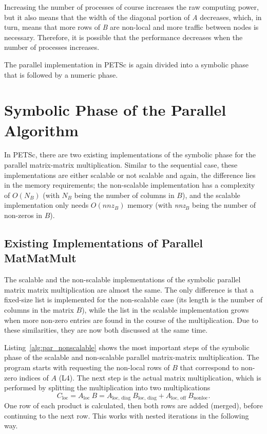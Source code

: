 Increasing the number of processes of course increases the raw computing power, but it also means that the width of the diagonal portion of \textit{A} decreases, which, in turn, means that more rows of \textit{B} are non-local and  more traffic between nodes is necessary. Therefore, it is possible that the performance decreases when the number of processes increases.

The parallel implementation in PETSc is again divided into a symbolic phase that is followed by a numeric phase. 


\section{Symbolic Phase of the Parallel Algorithm}
In PETSc, there are two existing implementations of the symbolic phase for the parallel matrix-matrix multiplication. Similar to the sequential case, these implementations are either scalable or not scalable and again, the difference lies in the memory requirements; the non-scalable implementation has a complexity of $O(N_B)$ (with $N_B$ being the number of columns in $B$), and the scalable implementation only needs $O(\textit{nnz}_B)$ memory (with \textit{nnz}$_B$ being the number of non-zeros in $B$).

\subsection{Existing Implementations of Parallel MatMatMult}
\label{sec:existing_impl}
The scalable and the non-scalable implementations of the symbolic parallel matrix matrix multiplication are almost the same. The only difference is that a fixed-size list is implemented for the non-scalable case (its length is the number of columns in the matrix $B$), while the list in the scalable implementation grows when more non-zero entries are found in the course of the multiplication. Due to these similarities, they are now both discussed at the same time.


Listing~\ref{alg:par_nonscalable} shows the most important steps of the symbolic phase of the scalable and non-scalable parallel matrix-matrix multiplication. The program starts with requesting the non-local rows of $B$ that correspond to non-zero indices of $A$ (L4). The next step is the actual matrix multiplication, which is performed by splitting the multiplication into two multiplications 
\begin{equation}
C_{\textrm{loc}} = A_{\textrm{loc~}} B = A_{\textrm{loc, diag~}} B_{\textrm{loc, diag}} + A_{\textrm{loc, off~}} B_{\mathrm{nonloc}}.
\end{equation}
One row of each product is calculated, then both rows are added (merged), before continuing to the next row. This works with nested iterations in the following way. 

